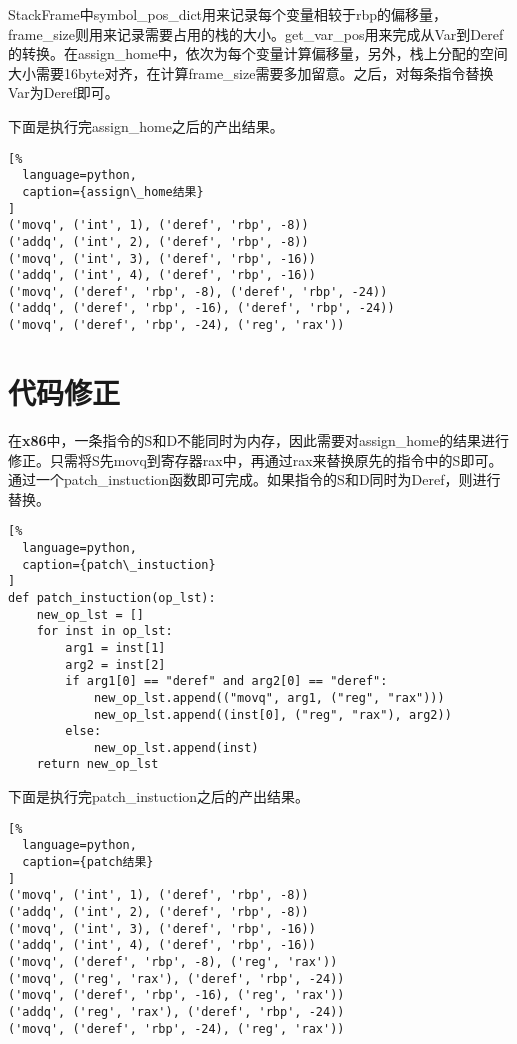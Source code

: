 StackFrame中symbol\_pos\_dict用来记录每个变量相较于rbp的偏移量，frame\_size则用来记录需要占用的栈的大小。get\_var\_pos用来完成从Var到Deref的转换。在assign\_home中，依次为每个变量计算偏移量，另外，栈上分配的空间大小需要16byte对齐，在计算frame\_size需要多加留意。之后，对每条指令替换Var为Deref即可。

下面是执行完assign\_home之后的产出结果。

\begin{lstlisting}[%
  language=python,
  caption={assign\_home结果}
]
('movq', ('int', 1), ('deref', 'rbp', -8))
('addq', ('int', 2), ('deref', 'rbp', -8))
('movq', ('int', 3), ('deref', 'rbp', -16))
('addq', ('int', 4), ('deref', 'rbp', -16))
('movq', ('deref', 'rbp', -8), ('deref', 'rbp', -24))
('addq', ('deref', 'rbp', -16), ('deref', 'rbp', -24))
('movq', ('deref', 'rbp', -24), ('reg', 'rax'))
\end{lstlisting}



\section{代码修正}

在\textbf{x86}中，一条指令的S和D不能同时为内存，因此需要对assign\_home的结果进行修正。只需将S先movq到寄存器rax中，再通过rax来替换原先的指令中的S即可。通过一个patch\_instuction函数即可完成。如果指令的S和D同时为Deref，则进行替换。

\begin{lstlisting}[%
  language=python,
  caption={patch\_instuction}
]
def patch_instuction(op_lst):
    new_op_lst = []
    for inst in op_lst:
        arg1 = inst[1]
        arg2 = inst[2]
        if arg1[0] == "deref" and arg2[0] == "deref":
            new_op_lst.append(("movq", arg1, ("reg", "rax")))
            new_op_lst.append((inst[0], ("reg", "rax"), arg2))
        else:
            new_op_lst.append(inst)
    return new_op_lst
\end{lstlisting}

下面是执行完patch\_instuction之后的产出结果。

\begin{lstlisting}[%
  language=python,
  caption={patch结果}
]
('movq', ('int', 1), ('deref', 'rbp', -8))
('addq', ('int', 2), ('deref', 'rbp', -8))
('movq', ('int', 3), ('deref', 'rbp', -16))
('addq', ('int', 4), ('deref', 'rbp', -16))
('movq', ('deref', 'rbp', -8), ('reg', 'rax'))
('movq', ('reg', 'rax'), ('deref', 'rbp', -24))
('movq', ('deref', 'rbp', -16), ('reg', 'rax'))
('addq', ('reg', 'rax'), ('deref', 'rbp', -24))
('movq', ('deref', 'rbp', -24), ('reg', 'rax'))
\end{lstlisting}

